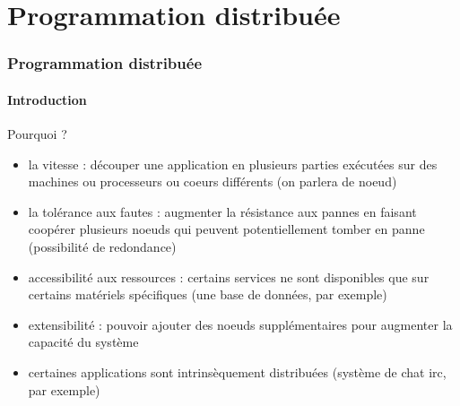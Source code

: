 \section{Programmation distribuée}

\begin{frame}[fragile]
  \frametitle{Programmation distribuée}
  \framesubtitle{Introduction}

  \begin{block}{Pourquoi ?}
    \begin{itemize}
    \item la vitesse : découper une application en plusieurs parties exécutées
      sur des machines ou processeurs ou coeurs différents (on parlera de noeud)
    \item la tolérance aux fautes : augmenter la résistance aux pannes en
      faisant coopérer plusieurs noeuds qui peuvent potentiellement tomber en
      panne (possibilité de redondance)
    \item accessibilité aux ressources : certains services ne sont disponibles
      que sur certains matériels spécifiques (une base de données, par exemple)
    \item extensibilité : pouvoir ajouter des noeuds supplémentaires pour
      augmenter la capacité du système
    \item certaines applications sont intrinsèquement distribuées (système
      de chat irc, par exemple)
    \end{itemize}
  \end{block}

\end{frame}

